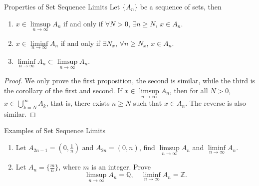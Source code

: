 \begin{proposition}{Properties of Set Sequence Limits}{}
  Let $\{A_n\}$ be a sequence of sets, then
  \begin{enumerate}
  \item $x \in \limsup \limits_{n \rightarrow \infty} A_n$ if and only if
    $\forall N > 0$, $\exists n \geq N$, $x \in A_n$.
  \item $x \in \liminf \limits_{n \rightarrow \infty} A_n$ if and only if
    $\exists N_x$, $\forall n \geq N_x$, $x \in A_n$.
  \item $\liminf \limits_{n \rightarrow \infty} A_n \subset \limsup \limits_{n
      \rightarrow \infty} A_n$.
  \end{enumerate}
\end{proposition}

\begin{proof}
  We only prove the first proposition, the second is similar,
  while the third is the corollary of the first and second.
  If $x \in \limsup\limits_{n \rightarrow \infty}A_n$,
  then for all $N > 0$, $x \in \bigcup \limits_{k = N}^{\infty}A_k$,
  that is, there exists $n \geq N$ such that $x \in A_n$.
  The reverse is also similar.
\end{proof}

\begin{example}{Examples of Set Sequence Limits}{}
  \begin{enumerate}
  \item Let $A_{2n-1} = (0, \frac{1}{n})$ and $A_{2n} = (0, n)$, find
    $\limsup \limits_{n \rightarrow \infty} A_n$ and $\liminf \limits_{n \rightarrow \infty} A_n$.
  \item Let $A_n = \{\frac{m}{n}\}$, where $m$ is an integer. Prove
    \begin{equation}
      \limsup \limits_{n \rightarrow \infty} A_n = \mathbb{Q}, \quad
      \liminf \limits_{n \rightarrow \infty} A_n = \mathbb{Z}.
    \end{equation}
  \end{enumerate}
\end{example}

